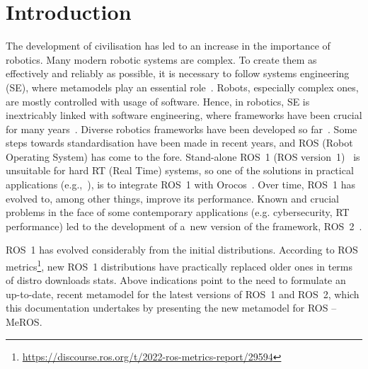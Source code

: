 \section{Introduction}
\label{sec:intro}
The development of civilisation has led to an increase in the importance of robotics. Many modern robotic systems are complex. To create them as effectively and reliably as possible, it is necessary to follow systems engineering (SE), where metamodels play an essential role~\cite{bezivin2004search,schmidt2006model,kent2002model}.
Robots, especially complex ones, are mostly controlled with usage of software. Hence, in robotics, SE is inextricably linked with software engineering, where frameworks have been crucial for many years~\cite{mnkandla2009software,shehory2014agent}.
Diverse robotics frameworks have been developed so far~\cite{inigo2012robotics,tsardoulias2017robotic,hentout2016survey}. Some steps towards standardisation have been made in recent years, and ROS (Robot Operating System) has come to the fore. Stand-alone ROS~1 (ROS version~1)~\cite{quigley2009ros} is unsuitable for hard RT (Real Time) systems, so one of the solutions in practical applications (e.g.,~\cite{lages2014architecture,buys2011haptic,pages2016tiago,Seredynski-fabric-romoco-2019,kornuta-bpan-2020,cholewinski2015software}), is to integrate ROS~1 with Orocos~\cite{bruyninckx2001open,bruyninckx2002orocos}. Over time, ROS~1 has evolved to, among other things, improve its performance. Known and crucial problems in the face of some contemporary applications (e.g. cybersecurity, RT performance) led to the development of a~new version of the framework, ROS~2~\cite{maruyama2016exploring,park2020real}.

ROS~1 has evolved considerably from the initial distributions. According to ROS metrics\footnote{\url{https://discourse.ros.org/t/2022-ros-metrics-report/29594}}, new ROS~1 distributions have practically replaced older ones in terms of distro downloads stats. Above indications point to the need to formulate an up-to-date, recent metamodel for the latest versions of ROS~1 and ROS~2, which this documentation undertakes by presenting the new metamodel for ROS -- MeROS.

